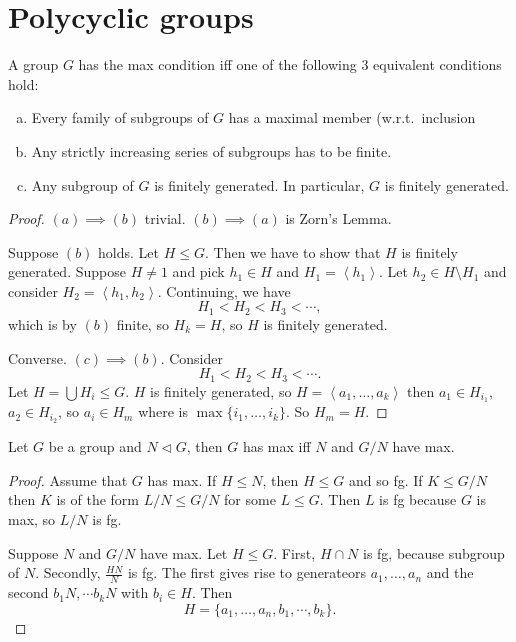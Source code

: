 \part{Polycyclic groups}
\renewcommand{\thesection}{\Alph{section}}


 \begin{definition}
    A group $G$ has the max condition iff one of the following $3$ equivalent conditions hold:
    \begin{enumerate}[(a)]
        \item Every family of subgroups of $G$ has a maximal member (w.r.t.\ inclusion
        \item Any strictly increasing series of subgroups has to be finite.
        \item Any subgroup of $G$ is finitely generated. In particular, $G$ is finitely generated.
    \end{enumerate}
\end{definition}
\begin{proof}
    $(a) \implies (b)$ trivial.
    $(b) \implies (a)$ is Zorn's Lemma.

    Suppose $(b)$ holds.
    Let  $H \le  G$. Then we have to show that $H$ is finitely generated. Suppose  $H \neq  1$ and pick $h_1 \in H$ and $H_1 = \left<h_1 \right>$.
    Let $h_2 \in  H \setminus H_1$ and consider $ H_2 = \left<h_1, h_2 \right>$.
    Continuing, we have
    \[
    H_1 < H_2 < H_3 < \cdots 
    ,\] 
    which is by $(b)$ finite, so  $H_k = H$, so  $H$ is finitely generated.

    Converse.  $(c) \implies (b)$.
    Consider
    \[
    H_1 < H_2 < H_3 < \cdots
    .\] 
    Let $H = \bigcup H_i \le G$.
    $H$ is finitely generated, so  $H = \left<a_1, \ldots, a_k \right>$
    then $ a_1 \in H_{i_1}$, $ a_2 \in H_{i_2}$, so $a_i \in H_m$ where is $\max \{i_1, \ldots, i_k\} $.
    So $H_m = H$.
\end{proof}

\begin{prop}
    Let $G$ be a group and $N \triangleleft G$, then $G$ has max iff $N$ and $G / N$ have max.
\end{prop}
\begin{proof}
    Assume that $G$ has max.
    If $H \le N$, then $H \le  G$ and so fg.
    If $K \le  G / N$ then $K$ is of the form $L / N \le  G / N$ for some $L \le G$. Then $L$ is fg because $G$ is max, so $L / N$ is fg.

    Suppose $N$ and $G / N$ have max.
    Let  $H \le G$.
    First, $H \cap N$ is fg, because subgroup of $N$. 
    Secondly, $\frac{H N}{N}$ is fg.
    The first gives rise to  generateors $ a_1, \ldots, a_n$ and the second $ b_1N, \cdots b_k N$ with $b_i \in H$.
    Then 
    \[
    H = \{a_1, \ldots, a_n, b_1, \cdots, b_k\} 
    .\] 
\end{proof}

